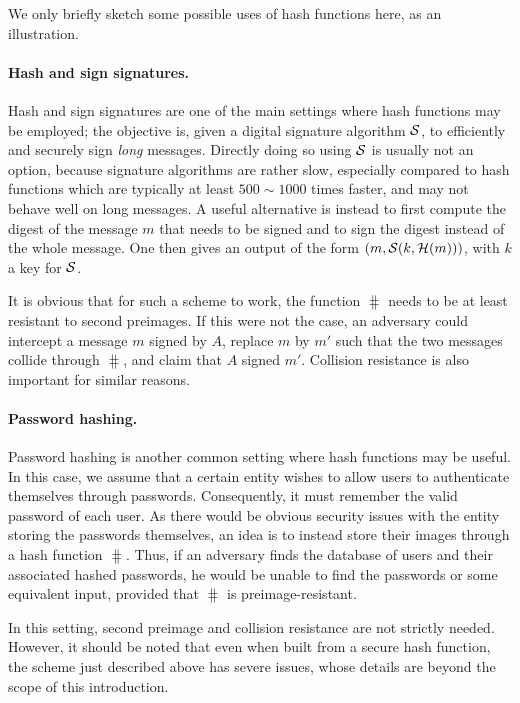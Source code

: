 We only briefly sketch some possible uses of hash functions here, as an illustration.

\paragraph{Hash and sign signatures.} Hash and sign signatures are one of the main settings where hash functions may be employed; the objective is, given a digital signature
algorithm $\operatorname{\mathcal{S}}$, to efficiently and securely sign \emph{long} messages. Directly doing so using $\operatorname{\mathcal{S}}$ is usually not an option, because signature algorithms are rather slow, especially compared
to hash functions which are typically at least $500 \sim 1000$ times faster, and may not behave well on long messages.
A useful alternative is instead to first compute the digest of the
message $m$ that needs to be signed and to sign the digest instead of the whole message.
One then gives an output of the form $(m, \operatorname{\mathcal{S}}(k,\operatorname{\mathcal{H}}(m)))$, with $k$ a key for $\operatorname{\mathcal{S}}$.

It is obvious that for such a scheme to work, the function $\hash$ needs to be at least resistant to second preimages. If this were not the case, an adversary could intercept a message $m$
signed by $A$, replace $m$ by $m'$ such that the two messages collide through $\hash$, and claim that $A$ signed $m'$.
Collision resistance is also important for similar reasons.

\paragraph{Password hashing.} Password hashing is another common setting where hash functions may be useful. In this case, we assume that a certain entity wishes to allow users to authenticate themselves
through passwords. Consequently, it must remember the valid password of each user. As there would be obvious security issues with the entity storing the passwords themselves, an idea
is to instead store their images through a hash function $\hash$. Thus, if an adversary finds the database of users and their associated hashed passwords, he would be unable to find
the passwords or some equivalent input, provided that $\hash$ is preimage-resistant.

In this setting, second preimage and collision resistance are not strictly needed. However, it should be noted that even when built from a secure hash function,
the scheme just described above has severe issues, whose details are beyond the scope of this introduction.

